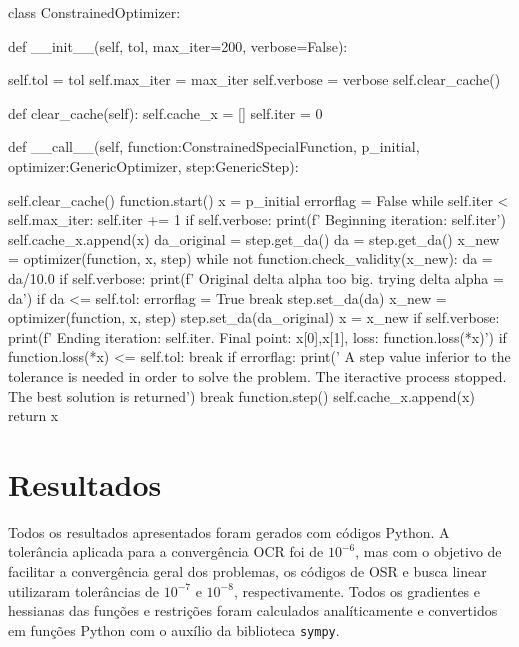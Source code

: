 \documentclass[10pt, a4paper]{article}
\begin{document}
\begin{python}
class ConstrainedOptimizer:

def __init__(self, tol, max_iter=200, verbose=False):

    self.tol = tol
    self.max_iter = max_iter
    self.verbose = verbose
    self.clear_cache()

def clear_cache(self):
    self.cache_x = []
    self.iter = 0

def __call__(self, function:ConstrainedSpecialFunction, p_initial, optimizer:GenericOptimizer, step:GenericStep):

    self.clear_cache()
    function.start()
    x = p_initial
    errorflag = False
    while self.iter < self.max_iter:
        self.iter += 1
        if self.verbose: print(f'    Beginning iteration: {self.iter}')
        self.cache_x.append(x)
        da_original = step.get_da()
        da = step.get_da()
        x_new = optimizer(function, x, step)
        while not function.check_validity(x_new):
            da = da/10.0
            if self.verbose: print(f'       Original delta alpha too big. trying delta alpha = {da}')
            if da <= self.tol:
                errorflag = True
                break
            step.set_da(da)
            x_new = optimizer(function, x, step)
        step.set_da(da_original)
        x = x_new
        if self.verbose: print(f'    Ending iteration: {self.iter}. Final point: {x[0]},{x[1]}, loss: {function.loss(*x)}')
        if function.loss(*x) <= self.tol: 
            break
        if errorflag:
            print('    A step value inferior to the tolerance is needed in order to solve the problem. The iteractive process stopped. The best solution is returned')
            break
        function.step()
    self.cache_x.append(x)
    return x
\end{python}

\section{Resultados}

Todos os resultados apresentados foram gerados com códigos Python. A tolerância aplicada para a convergência OCR foi de $10^{-6}$, mas com o objetivo de facilitar
a convergência geral dos problemas, os códigos de OSR e busca linear utilizaram tolerâncias de $10^{-7}$ e $10^{-8}$, respectivamente. Todos os gradientes e hessianas
das funções e restrições foram calculados analíticamente e convertidos em funções Python com o auxílio da biblioteca {\tt sympy}.
\end{document}
